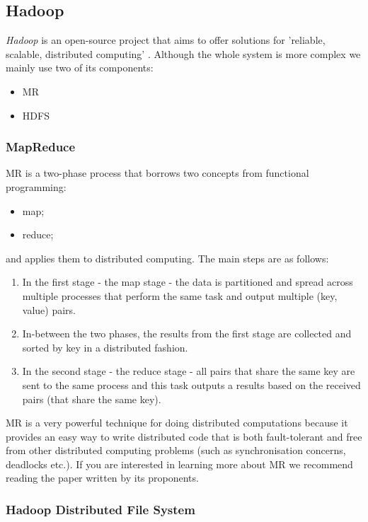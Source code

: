 \subsection{Hadoop}

\emph{Hadoop} is an open-source project that aims to offer solutions for
'reliable, scalable, distributed computing' .
Although the whole system is more complex we mainly use two of its components:
\begin{itemize}
  \item \acl{MR}
  \item \acl{HDFS}
\end{itemize}

\subsubsection{MapReduce}

\acf{MR} is a two-phase process that borrows two concepts from functional
programming:
\begin{itemize}
  \item map;
  \item reduce;
\end{itemize}
and applies them to distributed computing.
The main steps are as follows:
\begin{enumerate}
  \item In the first stage - the map stage - the data is partitioned and spread
  across multiple processes that perform the same task and output multiple
  (key, value) pairs.
  \item In-between the two phases, the results from the first stage are
  collected and sorted by key in a distributed fashion.
  \item In the second stage - the reduce stage - all pairs that share the same
  key are sent to the same process and this task outputs a results based on the
  received pairs (that share the same key).
\end{enumerate}
\acf{MR} is a very powerful technique for doing distributed computations
because it provides an easy way to write distributed code that is both
fault-tolerant and free from other distributed computing problems (such as
synchronisation concerns, deadlocks etc.).
If you are interested in learning more about \acf{MR} we recommend reading the
paper \cite{dean2008mapreduce} written by its proponents.

\subsubsection{Hadoop Distributed File System}

